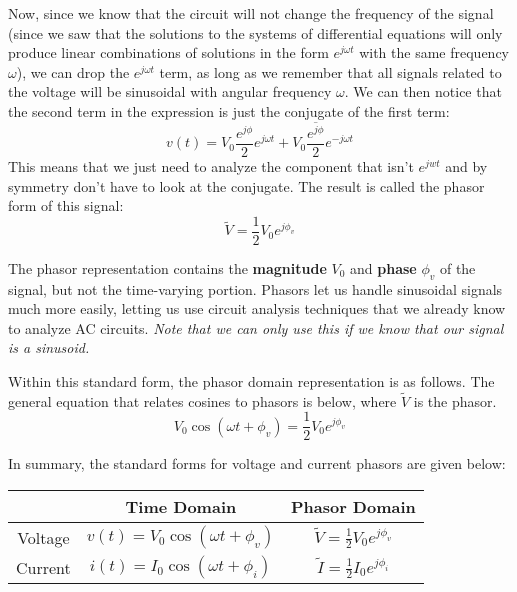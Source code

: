 Now, since we know that the circuit will not change the frequency of the signal (since we saw that the solutions to the systems of differential equations will only produce linear combinations of solutions in the form $e^{j\omega t}$ with the same frequency $\omega$), we can drop the $e^{j\omega t}$ term, as long as we remember that all signals related to the voltage will be sinusoidal with angular frequency $\omega$.
We can then notice that the second term in the expression is just the conjugate of the first term:
\[v(t) = V_0\frac{e^{j\phi}}{2}e^{j\omega t} + V_0 \overline{\frac{e^{j\phi}}{2}}e^{-j\omega t}\]
This means that we just need to analyze the component that isn't $e^{jwt}$ and by symmetry don't have to look at the conjugate.
The result is called the phasor form of this signal:
\[\boxed{\widetilde{V}=\frac{1}{2}V_0e^{j\phi_v}}\]

The phasor representation contains the \textbf{magnitude} $V_0$ and \textbf{phase} $\phi_v$ of the signal, but not the time-varying portion. Phasors let us handle sinusoidal signals much more easily, letting us use circuit analysis techniques that we already know to analyze AC circuits. \textit{Note that we can only use this if we know that our signal is a sinusoid.}

Within this standard form, the phasor domain representation is as follows. The general equation that relates cosines to phasors is below, where $\widetilde{V}$ is the phasor.
\[V_0 \cos(\omega t + \phi_v) = \frac{1}{2}V_0e^{j\phi_v} \]

In summary, the standard forms for voltage and current phasors are given below:
\begin{center} \begin{tabular}{|c|c|c|}
\hline
        & Time Domain                         & Phasor Domain \\ \hline
Voltage & $v(t) = V_0 \cos(\omega t + \phi_v)$ & $\widetilde{V} = \frac{1}{2} V_0 e^{j\phi_v}$ \\ %
Current & $i(t) = I_0 \cos(\omega t + \phi_i)$ & $\widetilde{I} = \frac{1}{2} I_0 e^{j\phi_i}$ \\%
\hline
\end{tabular} \end{center}

